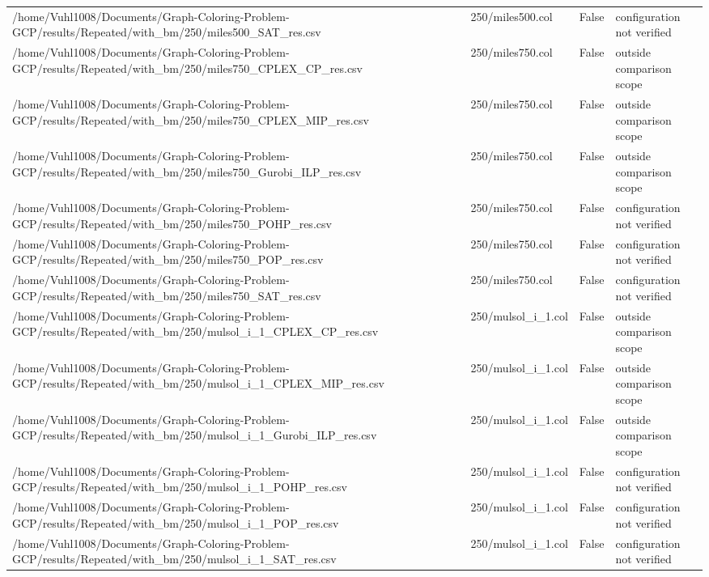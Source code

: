 \begin{table}[htbp]
\begin{tabular}{llll}
/home/Vuhl1008/Documents/Graph-Coloring-Problem-GCP/results/Repeated/with\_bm/250/miles500\_SAT\_res.csv & 250/miles500.col & False & configuration not verified \\
/home/Vuhl1008/Documents/Graph-Coloring-Problem-GCP/results/Repeated/with\_bm/250/miles750\_CPLEX\_CP\_res.csv & 250/miles750.col & False & outside comparison scope \\
/home/Vuhl1008/Documents/Graph-Coloring-Problem-GCP/results/Repeated/with\_bm/250/miles750\_CPLEX\_MIP\_res.csv & 250/miles750.col & False & outside comparison scope \\
/home/Vuhl1008/Documents/Graph-Coloring-Problem-GCP/results/Repeated/with\_bm/250/miles750\_Gurobi\_ILP\_res.csv & 250/miles750.col & False & outside comparison scope \\
/home/Vuhl1008/Documents/Graph-Coloring-Problem-GCP/results/Repeated/with\_bm/250/miles750\_POHP\_res.csv & 250/miles750.col & False & configuration not verified \\
/home/Vuhl1008/Documents/Graph-Coloring-Problem-GCP/results/Repeated/with\_bm/250/miles750\_POP\_res.csv & 250/miles750.col & False & configuration not verified \\
/home/Vuhl1008/Documents/Graph-Coloring-Problem-GCP/results/Repeated/with\_bm/250/miles750\_SAT\_res.csv & 250/miles750.col & False & configuration not verified \\
/home/Vuhl1008/Documents/Graph-Coloring-Problem-GCP/results/Repeated/with\_bm/250/mulsol\_i\_1\_CPLEX\_CP\_res.csv & 250/mulsol\_i\_1.col & False & outside comparison scope \\
/home/Vuhl1008/Documents/Graph-Coloring-Problem-GCP/results/Repeated/with\_bm/250/mulsol\_i\_1\_CPLEX\_MIP\_res.csv & 250/mulsol\_i\_1.col & False & outside comparison scope \\
/home/Vuhl1008/Documents/Graph-Coloring-Problem-GCP/results/Repeated/with\_bm/250/mulsol\_i\_1\_Gurobi\_ILP\_res.csv & 250/mulsol\_i\_1.col & False & outside comparison scope \\
/home/Vuhl1008/Documents/Graph-Coloring-Problem-GCP/results/Repeated/with\_bm/250/mulsol\_i\_1\_POHP\_res.csv & 250/mulsol\_i\_1.col & False & configuration not verified \\
/home/Vuhl1008/Documents/Graph-Coloring-Problem-GCP/results/Repeated/with\_bm/250/mulsol\_i\_1\_POP\_res.csv & 250/mulsol\_i\_1.col & False & configuration not verified \\
/home/Vuhl1008/Documents/Graph-Coloring-Problem-GCP/results/Repeated/with\_bm/250/mulsol\_i\_1\_SAT\_res.csv & 250/mulsol\_i\_1.col & False & configuration not verified \\

\end{tabular}
\end{table}
